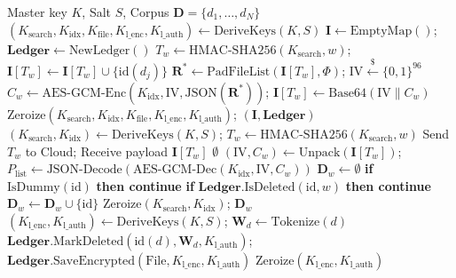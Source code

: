 \documentclass[10pt,conference]{IEEEtran}
\begin{document}
\begin{algorithm}[t]
\caption{VisioCrypt Volume-Hiding SSE with Authoritative Deletion Ledger}
\label{alg:protocols}
\scriptsize
\begin{algorithmic}[1]
\Require Master key $K$, Salt $S$, Corpus $\mathbf{D} = \{d_1, \dots, d_N\}$
    \State $(K_{\text{search}}, K_{\text{idx}}, K_{\text{file}}, K_{\text{l\_enc}}, K_{\text{l\_auth}}) \gets \text{DeriveKeys}(K, S)$
    \State $\mathbf{I} \gets \text{EmptyMap}()$; \quad $\mathbf{Ledger} \gets \text{NewLedger}()$
        \State $T_w \gets \text{HMAC-SHA256}(K_{\text{search}}, w)$; \quad $\mathbf{I}[T_w] \gets \mathbf{I}[T_w] \cup \{\text{id}(d_j)\}$
    \EndFor
        \State $\mathbf{R}^* \gets \text{PadFileList}(\mathbf{I}[T_w], \Phi)$; \quad $\text{IV} \xleftarrow{\$} \{0,1\}^{96}$
        \State $C_w \gets \text{AES-GCM-Enc}(K_{\text{idx}}, \text{IV}, \text{JSON}(\mathbf{R}^*))$; \quad $\mathbf{I}[T_w] \gets \text{Base64}(\text{IV} \parallel C_w)$
    \EndFor
    \State $\text{Zeroize}(K_{\text{search}}, K_{\text{idx}}, K_{\text{file}}, K_{\text{l\_enc}}, K_{\text{l\_auth}})$; \Return $(\mathbf{I}, \mathbf{Ledger})$
\EndProcedure
{}
    \State $(K_{\text{search}}, K_{\text{idx}}) \gets \text{DeriveKeys}(K, S)$; \quad $T_w \gets \text{HMAC-SHA256}(K_{\text{search}}, w)$
    \State Send $T_w$ to Cloud; \quad Receive payload $\mathbf{I}[T_w]$
     \Return $\emptyset$ \EndIf
    \State $(\text{IV}, C_w) \gets \text{Unpack}(\mathbf{I}[T_w])$; \quad $P_{\text{list}} \gets \text{JSON-Decode}(\text{AES-GCM-Dec}(K_{\text{idx}}, \text{IV}, C_w))$
    \State $\mathbf{D}_w \gets \emptyset$
        \State \textbf{if} $\text{IsDummy}(\text{id})$ \textbf{then continue}
        \State \textbf{if} $\mathbf{Ledger}.\text{IsDeleted}(\text{id}, w)$ \textbf{then continue} 
        \State $\mathbf{D}_w \gets \mathbf{D}_w \cup \{\text{id}\}$
    \EndFor
    \State $\text{Zeroize}(K_{\text{search}}, K_{\text{idx}})$; \Return $\mathbf{D}_w$
\EndProcedure
{}
    \State $(K_{\text{l\_enc}}, K_{\text{l\_auth}}) \gets \text{DeriveKeys}(K, S)$; \quad $\mathbf{W}_d \gets \text{Tokenize}(d)$
    \State $\mathbf{Ledger}.\text{MarkDeleted}(\text{id}(d), \mathbf{W}_d, K_{\text{l\_auth}})$; \quad $\mathbf{Ledger}.\text{SaveEncrypted}(\text{File}, K_{\text{l\_enc}}, K_{\text{l\_auth}})$
    \State $\text{Zeroize}(K_{\text{l\_enc}}, K_{\text{l\_auth}})$
\EndProcedure
\end{algorithmic}
\end{algorithm}
\end{document}
